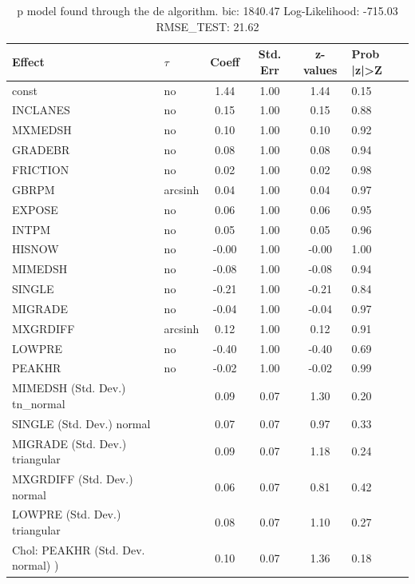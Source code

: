 \begin{table}
	\caption{p model found through the de algorithm. bic: 1840.47 Log-Likelihood: -715.03 RMSE_TEST: 21.62}
	\begin{center}
		\begin{tabular}{|l|l|c|c|c|l|}
			\hline
			Effect & $\tau$ & Coeff & Std. Err & z-values & Prob |z|>Z \\
			\hline
			const & no & 1.44 & 1.00 & 1.44 & 0.15 \\
			\hline
			INCLANES & no & 0.15 & 1.00 & 0.15 & 0.88 \\
			\hline
			MXMEDSH & no & 0.10 & 1.00 & 0.10 & 0.92 \\
			\hline
			GRADEBR & no & 0.08 & 1.00 & 0.08 & 0.94 \\
			\hline
			FRICTION & no & 0.02 & 1.00 & 0.02 & 0.98 \\
			\hline
			GBRPM & arcsinh & 0.04 & 1.00 & 0.04 & 0.97 \\
			\hline
			EXPOSE & no & 0.06 & 1.00 & 0.06 & 0.95 \\
			\hline
			INTPM & no & 0.05 & 1.00 & 0.05 & 0.96 \\
			\hline
			HISNOW & no & -0.00 & 1.00 & -0.00 & 1.00 \\
			\hline
			MIMEDSH & no & -0.08 & 1.00 & -0.08 & 0.94 \\
			\hline
			SINGLE & no & -0.21 & 1.00 & -0.21 & 0.84 \\
			\hline
			MIGRADE & no & -0.04 & 1.00 & -0.04 & 0.97 \\
			\hline
			MXGRDIFF & arcsinh & 0.12 & 1.00 & 0.12 & 0.91 \\
			\hline
			LOWPRE & no & -0.40 & 1.00 & -0.40 & 0.69 \\
			\hline
			PEAKHR & no & -0.02 & 1.00 & -0.02 & 0.99 \\
			\hline
			MIMEDSH (Std. Dev.) tn_normal &  & 0.09 & 0.07 & 1.30 & 0.20 \\
			\hline
			SINGLE (Std. Dev.) normal &  & 0.07 & 0.07 & 0.97 & 0.33 \\
			\hline
			MIGRADE (Std. Dev.) triangular &  & 0.09 & 0.07 & 1.18 & 0.24 \\
			\hline
			MXGRDIFF (Std. Dev.) normal &  & 0.06 & 0.07 & 0.81 & 0.42 \\
			\hline
			LOWPRE (Std. Dev.) triangular &  & 0.08 & 0.07 & 1.10 & 0.27 \\
			\hline
			 Chol: PEAKHR (Std. Dev. normal) ) &  & 0.10 & 0.07 & 1.36 & 0.18 \\
			\hline
		\end{tabular}
	\end{center}
\end{table}